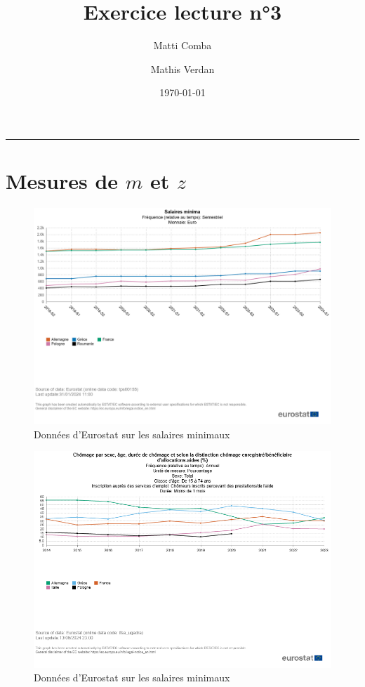 \documentclass{article}
\title{\Huge \textbf{Exercice lecture n°3}}
\author{Matti Comba \and Mathis Verdan}
\date{\today}
\begin{document}
\maketitle
\begin{center}
  \rule{\linewidth}{0.5mm}
\end{center}


\section{Mesures de $m$ et $z$}

\begin{figure}[H]
  \centering
  \begin{minipage}{0.8\textwidth}
      \centering
      \includegraphics[width=\textwidth]{"smic.png"}
      \caption{Données d'Eurostat sur les salaires minimaux}
  \end{minipage}
\end{figure}

  \begin{figure}[H]
    \centering
    \begin{minipage}{0.8\textwidth}
        \centering
        \includegraphics[width=\textwidth]{"allocations.png"}
        \caption{Données d'Eurostat sur les salaires minimaux}
    \end{minipage}
  \end{figure}
\end{document}
